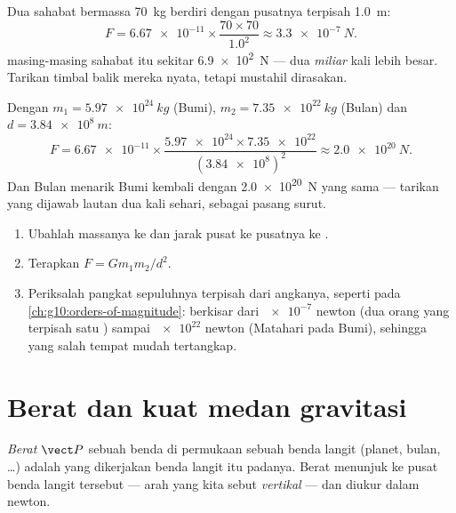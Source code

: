 \begin{example}\label{ex:g10:universal-gravitation:friends}
Dua sahabat bermassa \qty{70}{kg} berdiri dengan pusatnya terpisah
\qty{1.0}{m}:
\[
F = \num{6.67e-11} \times \frac{70 \times 70}{1.0^2}
\approx \qty{3.3e-7}{N}.
\]
 masing-masing sahabat itu sekitar \qty{6.9e2}{N} --- dua
\emph{miliar} kali lebih besar. Tarikan timbal balik mereka nyata,
tetapi mustahil dirasakan.
\end{example}

\begin{example}\label{ex:g10:universal-gravitation:earthmoon}
Dengan $m_1 = \qty{5.97e24}{kg}$ (Bumi), $m_2 = \qty{7.35e22}{kg}$
(Bulan) dan $d = \qty{3.84e8}{m}$:
\[
F = \num{6.67e-11} \times
\frac{\num{5.97e24} \times \num{7.35e22}}{(\num{3.84e8})^2}
\approx \qty{2.0e20}{N}.
\]
Dan Bulan menarik Bumi kembali dengan \qty{2.0e20}{N} yang sama ---
tarikan yang dijawab lautan dua kali sehari, sebagai pasang surut.
\end{example}

\begin{method}\label{met:g10:universal-gravitation:compute}
\begin{enumerate}
  \item Ubahlah massanya ke  dan jarak pusat ke pusatnya ke
        .
  \item Terapkan $F = G m_1 m_2 / d^2$.
  \item Periksalah pangkat sepuluhnya terpisah dari angkanya, seperti
        pada \cref{ch:g10:orders-of-magnitude}: 
        berkisar dari $\num{e-7}$ newton (dua orang yang terpisah satu
        ) sampai $\num{e22}$ newton (Matahari pada Bumi),
        sehingga  yang salah tempat mudah tertangkap.
\end{enumerate}
\end{method}

\section{Berat dan kuat medan gravitasi}

\begin{definition}[Berat]\label{def:g10:universal-gravitation:weight}
\emph{Berat} $\vect P$ sebuah benda di permukaan sebuah
benda langit (planet, bulan, \dots) adalah  yang
dikerjakan benda langit itu padanya. Berat menunjuk ke pusat benda
langit tersebut --- arah yang kita sebut
\emph{vertikal} --- dan diukur dalam newton.
\end{definition}

